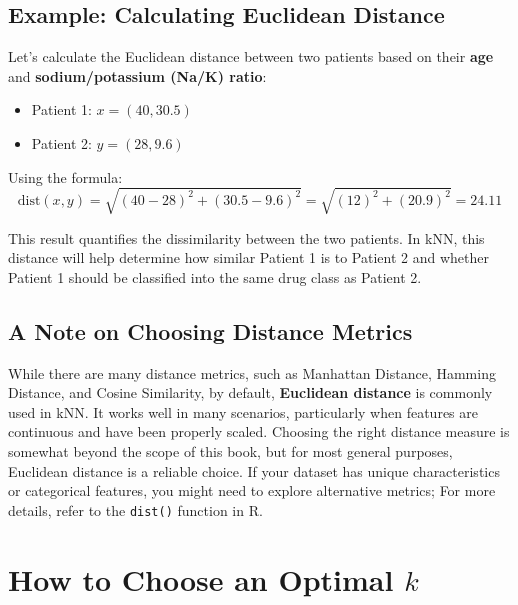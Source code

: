 \documentclass[
]{book}
\newcommand{\passthrough}[1]{#1}
\providecommand{\tightlist}{%
  \setlength{\itemsep}{0pt}\setlength{\parskip}{0pt}}
\theoremstyle{definition}
\theoremstyle{definition}
\theoremstyle{definition}
\theoremstyle{definition}
\theoremstyle{remark}
\begin{document}
\subsection{Example: Calculating Euclidean Distance}\label{example-calculating-euclidean-distance}

Let's calculate the Euclidean distance between two patients based on their \textbf{age} and \textbf{sodium/potassium (Na/K) ratio}:

\begin{itemize}
\tightlist
\item
  Patient 1: \(x = (40, 30.5)\)\\
\item
  Patient 2: \(y = (28, 9.6)\)
\end{itemize}

Using the formula:\\
\[
\text{dist}(x, y) = \sqrt{(40 - 28)^2 + (30.5 - 9.6)^2} = \sqrt{(12)^2 + (20.9)^2} = 24.11
\]

This result quantifies the dissimilarity between the two patients. In kNN, this distance will help determine how similar Patient 1 is to Patient 2 and whether Patient 1 should be classified into the same drug class as Patient 2.

\subsection*{A Note on Choosing Distance Metrics}\label{a-note-on-choosing-distance-metrics}

While there are many distance metrics, such as Manhattan Distance, Hamming Distance, and Cosine Similarity, by default, \textbf{Euclidean distance} is commonly used in kNN. It works well in many scenarios, particularly when features are continuous and have been properly scaled. Choosing the right distance measure is somewhat beyond the scope of this book, but for most general purposes, Euclidean distance is a reliable choice. If your dataset has unique characteristics or categorical features, you might need to explore alternative metrics; For more details, refer to the \passthrough{\lstinline!dist()!} function in R.

\section{\texorpdfstring{How to Choose an Optimal \(k\)}{How to Choose an Optimal k}}\label{how-to-choose-an-optimal-k}
\end{document}
